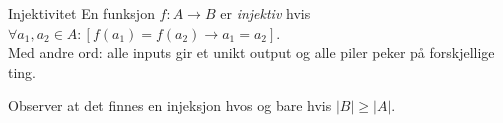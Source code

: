 \begin{frame}{Injektivitet}
En funksjon $f : A \rightarrow B$ er \emph{injektiv} hvis $\forall a_1, a_2 \in A : [f(a_1) = f(a_2) \rightarrow a_1 = a_2]$.\\
Med andre ord: alle inputs gir et unikt output og alle piler peker på forskjellige ting.
    \begin{figure}%
        \centering
        \qquad
        \qquad
        \label{fig:inj}%
    \end{figure}
    \pause
    Observer at det finnes en injeksjon hvos og bare hvis $|B| \geq |A|$.
\end{frame}

